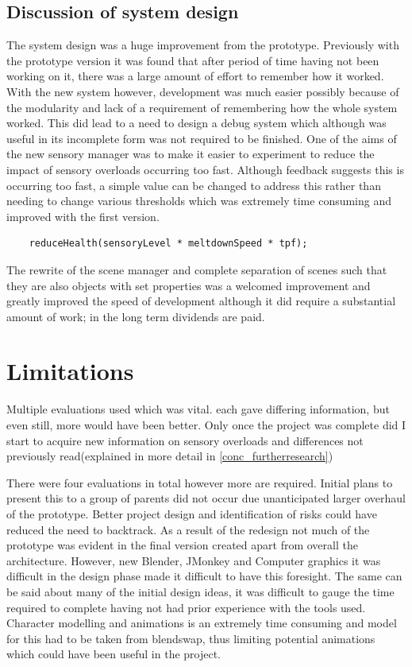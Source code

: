 \documentclass[11pt]{report}
\begin{document}
\subsection{Discussion of system design}
The system design was a huge improvement from the prototype. Previously with the prototype version it was found that after period of time having not been working on it, there was a large amount of effort to remember how it worked. With the new system however, development was much easier possibly because of the modularity and lack of a requirement of remembering how the whole system worked. This did lead to a need to design a debug system which although was useful in its incomplete form was not required to be finished. One of the aims of the new sensory manager was to make it easier to experiment to reduce the impact of sensory overloads occurring too fast. Although feedback suggests this is occurring too fast, a simple value can be changed to address this rather than needing to change various thresholds which was extremely time consuming and improved with the first version. 

\begin{lstlisting}
	reduceHealth(sensoryLevel * meltdownSpeed * tpf);
\end{lstlisting}

The rewrite of the scene manager and complete separation of scenes such that they are also objects with set properties was a welcomed improvement and greatly improved the speed of development although it did require a substantial amount of work; in the long term dividends are paid. 

\section{Limitations}

Multiple evaluations used which was vital. each gave differing information, but even still, more would have been better. Only once the project was complete did I start to acquire new information on sensory overloads and differences not previously read(explained in more detail in \ref{conc_furtherresearch})

There were four evaluations in total however more are required. Initial plans to present this to a group of parents did not occur due unanticipated larger overhaul of the prototype.
Better project design and identification of risks could have reduced the need to backtrack. As a result of the redesign not much of the prototype was evident in the final version created apart from overall the architecture. However, new Blender, JMonkey and Computer graphics it was difficult in the design phase made it difficult to have this foresight. The same can be said about many of the initial design ideas, it was difficult to gauge the time required to complete having not had prior experience with the tools used. Character modelling and animations is an extremely time consuming and model for this had to be taken from blendswap, thus limiting potential animations which could have been useful in the project. 
\end{document}
